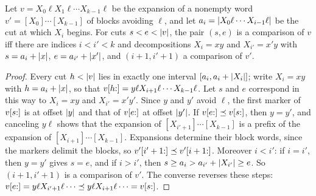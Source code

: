 \begin{lemma}\label{lem:bg-alignment}
Let $v=X_0\ell X_1\ell\cdots X_{k-1}\ell$ be the expansion of a nonempty word
$v'=[X_0]\cdots[X_{k-1}]$ of blocks avoiding $\ell$, and let
$a_i=\lvert X_0\ell\cdots X_{i-1}\ell\rvert$ be the cut at which $X_i$ begins. For cuts
$s<e<\lvert v\rvert$, the pair $(s,e)$ is a comparison of $v$ iff there are indices
$i<i'<k$ and decompositions $X_i=xy$ and $X_{i'}=x'y$ with $s=a_i+\lvert x\rvert$,
$e=a_{i'}+\lvert x'\rvert$, and $(i+1,i'+1)$ a comparison of $v'$.
\end{lemma}
\begin{proof}
Every cut $h<\lvert v\rvert$ lies in exactly one interval $[a_i,a_i+\lvert X_i\rvert]$; write
$X_i=xy$ with $h=a_i+\lvert x\rvert$, so that $v[h{:}]=y\ell X_{i+1}\ell\cdots
X_{k-1}\ell$. Let $s$ and $e$ correspond in this way to $X_i=xy$ and
$X_{i'}=x'y'$. Since $y$ and $y'$ avoid $\ell$, the first marker of $v[s{:}]$
is at offset $\lvert y\rvert$ and that of $v[e{:}]$ at offset $\lvert y'\rvert$. If
$v[e{:}]\preceq v[s{:}]$, then $y=y'$, and canceling $y\ell$ shows that the
expansion of $[X_{i'+1}]\cdots[X_{k-1}]$ is a prefix of the expansion of
$[X_{i+1}]\cdots[X_{k-1}]$. Expansions determine their block words, since the
markers delimit the blocks, so $v'[i'+1{:}]\preceq v'[i+1{:}]$. Moreover
$i<i'$: if $i=i'$, then $y=y'$ gives $s=e$, and if $i>i'$, then
$s\ge a_i>a_{i'}+\lvert X_{i'}\rvert\ge e$. So $(i+1,i'+1)$ is a comparison of $v'$.
The converse reverses these steps:
$v[e{:}]=y\ell X_{i'+1}\ell\cdots\preceq y\ell X_{i+1}\ell\cdots=v[s{:}]$.
\end{proof}

